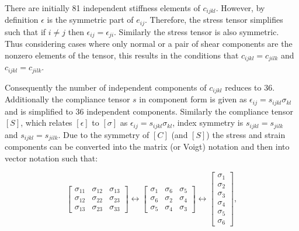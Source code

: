 \noindent There are initially 81 independent stiffness elements of $c_{ijkl}$. However, by definition $\epsilon$ is the symmetric part of $e_{ij}$. Therefore, the stress tensor simplifies such that if $i\neq j$ then $\epsilon_{ij} = \epsilon_{ji}$. Similarly the stress tensor is also symmetric. Thus considering cases where only normal or a pair of shear components are the nonzero elements of the tensor, this results in the conditions that $c_{ijkl}=c_{jilk}$ and $c_{ijkl}=c_{jilk}$. 

Consequently the number of independent components of $c_{ijkl}$ reduces to 36. Additionally the compliance tensor $s$ in component form is given as $\epsilon_{ij}=s_{ijkl}\sigma_{kl}$ and is simplified to 36 independent components. Similarly the compliance tensor $[S]$, which relates $[\epsilon]$ to $[\sigma]$ as $\epsilon_{ij}=s_{ijkl}\sigma_{kl}$, index symmetry is $s_{ijkl}=s_{jilk}$ and $s_{ijkl}=s_{jilk}$. Due to the symmetry of $[C]$ (and $[S]$) the stress and strain components can be converted into the matrix (or Voigt) notation and then into vector notation such that:

\begin{equation}
\label{eq:stresstensorsimiplified}
\begin{bmatrix}
\sigma_{11} & \sigma_{12} & \sigma_{13} \\ 
\sigma_{12} & \sigma_{22}  & \sigma_{23}\\ 
\sigma_{13} & \sigma_{23} & \sigma_{33}
\end{bmatrix}\leftrightarrow 
\begin{bmatrix}
\sigma_{1} & \sigma_{6} & \sigma_{5} \\ 
\sigma_{6} & \sigma_{2}  & \sigma_{4}\\ 
\sigma_{5} & \sigma_{4} & \sigma_{3}
\end{bmatrix} \leftrightarrow 
\begin{bmatrix}
\sigma_{1}\\ 
\sigma_{2}\\ 
\sigma_{3}\\ 
\sigma_{4}\\ 
\sigma_{5}\\ 
\sigma_{6}
\end{bmatrix},
\end{equation} 

